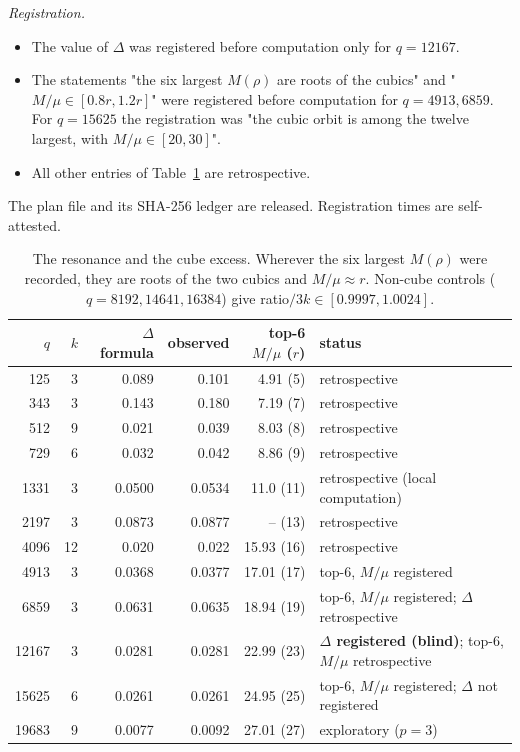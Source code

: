 \emph{Registration.}
\begin{itemize}
\item The value of $\Delta$ was registered before computation only for $q=12167$.
\item The statements "the six largest $M(\rho)$ are roots of the cubics" and "$M/\mu\in[0.8r,1.2r]$" were registered before computation for $q=4913,6859$. For $q=15625$ the registration was "the cubic orbit is among the twelve largest, with $M/\mu\in[20,30]$".
\item All other entries of Table~\ref{tab:res} are retrospective.
\end{itemize}
The plan file and its SHA-256 ledger are released. Registration times are self-attested.
\begin{table}[h]\centering\small
\begin{tabular}{rrrrrl}\toprule $q$&$k$&$\Delta$ formula&observed&top-6 $M/\mu$ ($r$)&status\\ \midrule
125&3&0.089&0.101&4.91 (5)&retrospective\\
343&3&0.143&0.180&7.19 (7)&retrospective\\
512&9&0.021&0.039&8.03 (8)&retrospective\\
729&6&0.032&0.042&8.86 (9)&retrospective\\
1331&3&0.0500&0.0534&11.0 (11)&retrospective (local computation)\\
2197&3&0.0873&0.0877&-- (13)&retrospective\\
4096&12&0.020&0.022&15.93 (16)&retrospective\\
4913&3&0.0368&0.0377&17.01 (17)&top-6, $M/\mu$ registered\\
6859&3&0.0631&0.0635&18.94 (19)&top-6, $M/\mu$ registered; $\Delta$ retrospective\\
12167&3&0.0281&0.0281&22.99 (23)&\textbf{$\Delta$ registered (blind)}; top-6, $M/\mu$ retrospective\\
15625&6&0.0261&0.0261&24.95 (25)&top-6, $M/\mu$ registered; $\Delta$ not registered\\
19683&9&0.0077&0.0092&27.01 (27)&exploratory ($p=3$)\\
\bottomrule\end{tabular}
\caption{The resonance and the cube excess. Wherever the six largest $M(\rho)$ were recorded, they are roots of the two cubics and $M/\mu\approx r$.
Non-cube controls ($q=8192,14641,16384$) give ratio$/3k\in[0.9997,1.0024]$.}\label{tab:res}\end{table}

